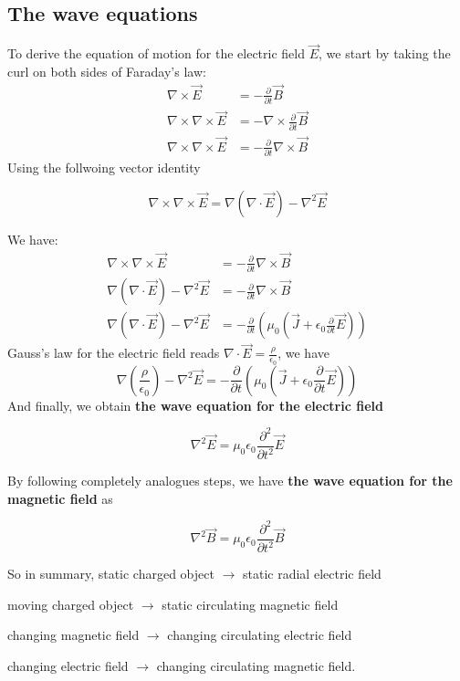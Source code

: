 \subsection{The wave equations}
To derive the equation of motion for the electric field $\overrightarrow{E}$, we start by taking the curl on both sides of Faraday's law:
$$
\begin{aligned}
\nabla \times \vec{E} &=-\frac{\partial}{\partial t} \vec{B} \\
\nabla \times \nabla \times \vec{E} &=-\nabla \times \frac{\partial}{\partial t} \vec{B} \\
\nabla \times \nabla \times \vec{E} &=-\frac{\partial}{\partial t} \nabla \times \vec{B}
\end{aligned}
$$
Using the follwoing vector identity
\begin{qt}
\begin{equation}
\nabla \times \nabla \times \vec{E}=\nabla(\nabla \cdot \vec{E})-\nabla^{2} \vec{E}
\end{equation}
\end{qt}
We have:
$$
\begin{aligned}
\nabla \times \nabla \times \vec{E} &=-\frac{\partial}{\partial t} \nabla \times \vec{B} \\
\nabla(\nabla \cdot \vec{E})-\nabla^{2} \vec{E} &=-\frac{\partial}{\partial t} \nabla \times \vec{B} \\
\nabla(\nabla \cdot \vec{E})-\nabla^{2} \vec{E} &=-\frac{\partial}{\partial t}\left(\mu_{0}\left(\vec{J}+\epsilon_{0} \frac{\partial}{\partial t} \vec{E}\right)\right)
\end{aligned}
$$
Gauss's law for the electric field reads $\nabla \cdot \vec{E}=\frac{\rho}{\epsilon_{0}}$, we have
$$
\nabla\left(\frac{\rho}{\epsilon_{0}}\right)-\nabla^{2} \vec{E}=-\frac{\partial}{\partial t}\left(\mu_{0}\left(\vec{J}+\epsilon_{0} \frac{\partial}{\partial t} \vec{E}\right)\right)
$$
And finally, we obtain \textbf{the wave equation for the electric field}
\begin{qt}
\begin{equation}
\nabla^{2} \vec{E}=\mu_{0} \epsilon_{0} \frac{\partial^{2}}{\partial t^{2}} \vec{E}
\end{equation}
\end{qt}
By following completely analogues steps, we have
\textbf{the wave equation for the magnetic field} as
\begin{qt}
\begin{equation}
\nabla^{2} \vec{B}=\mu_{0} \epsilon_{0} \frac{\partial^{2}}{\partial t^{2}} \vec{B}
\end{equation}
\end{qt}

So in summary, 
static charged object $\rightarrow$ static radial electric field

moving charged object $\rightarrow$ static circulating magnetic field

changing magnetic field $\rightarrow$ changing circulating electric field 

changing electric field $\rightarrow$ changing circulating magnetic field.